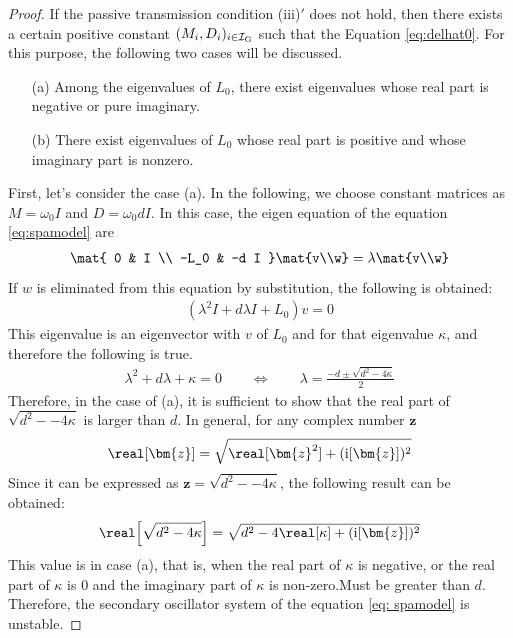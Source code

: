 \documentclass[graybox, envcountchap]{svmult}
\begin{document}
\begin{proof}
If the passive transmission condition (iii)$'$ does not hold, then there exists a certain positive constant $(M_i,D_i)_{i \in \mathcal{I}_{\rm G}}$ such that the Equation \ref{eq:delhat0}.
For this purpose, the following two cases will be discussed.
\begin{itemize}
\item[(a)] Among the eigenvalues of $L_0$, there exist eigenvalues whose real part is negative or pure imaginary.
\item[(b)] There exist eigenvalues of $L_0$ whose real part is positive and whose imaginary part is nonzero.
\end{itemize}
First, let's consider the case (a).
In the following, we choose constant matrices as $M=\omega_0 I$ and $D=\omega_0 d I$.
In this case, the eigen equation of the equation \ref{eq:spamodel} are
\begin{align*}
\mat{
0 & I \\
-L_0 & -d I
}
\mat{v\\w}
=
\lambda \mat{v\\w}
\end{align*}
If $ w $ is eliminated from this equation by substitution, the following is obtained:
\begin{align*}
\left(\lambda^2 I +d \lambda I + L_0
\right) v =0
\end{align*}
This eigenvalue is an eigenvector with $ v $ of $ L_0 $ and for that eigenvalue $ \kappa $, and therefore the following is true.
\begin{align}\label{eq:lamsq}
\lambda^2 + d\lambda +\kappa =0
\qquad
\Longleftrightarrow
\qquad
\lambda = \frac{-d \pm \sqrt{d^2-4\kappa} }{2}
\end{align}
Therefore, in the case of (a), it is sufficient to show that the real part of $ \sqrt{d^2--4\kappa} $ is larger than $ d $.
In general, for any complex number $ \bm{z} $
\begin{align*}
\real[\bm{z}] = \sqrt{ \real[\bm{z}^2 ] + (\imag[\bm{z}])^2 }
\end{align*}
Since it can be expressed as $ \bm{z} = \sqrt{d^2--4\kappa} $, the following result can be obtained:
\begin{align*}
\real \Bigl[
\sqrt{d^2 - 4\kappa }
\Bigr]
=\sqrt{
d^2 - 4 \real[\kappa]
+
(\imag[ \bm{z} ])^2
}
\end{align*}
This value is in case (a), that is, when the real part of $ \kappa $ is negative, or the real part of $ \kappa $ is 0 and the imaginary part of $ \kappa $ is non-zero.Must be greater than $ d $.
Therefore, the secondary oscillator system of the equation \ref{eq: spamodel} is unstable.


\end{proof}
\end{document}
